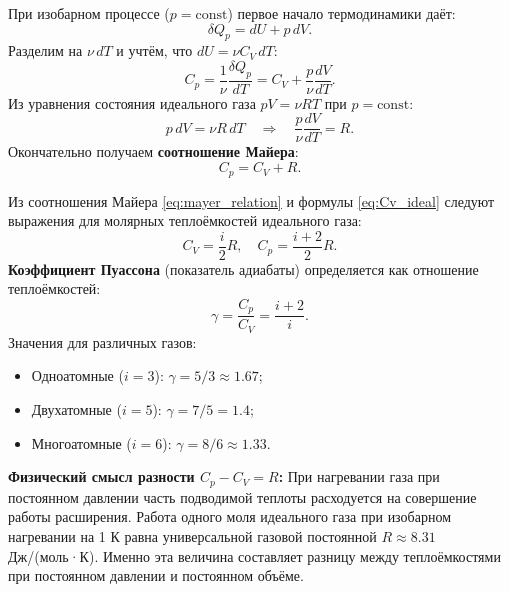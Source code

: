 \begin{theorem}
При изобарном процессе ($p = \text{const}$) первое начало термодинамики даёт:
\begin{equation}
    \delta Q_p = dU + p \, dV.
\end{equation}
Разделим на $\nu \, dT$ и учтём, что $dU = \nu C_V \, dT$:
\begin{equation}
    C_p = \frac{1}{\nu} \frac{\delta Q_p}{dT} = C_V + \frac{p}{\nu} \frac{dV}{dT}.
\end{equation}
Из уравнения состояния идеального газа $pV = \nu R T$ при $p = \text{const}$:
\begin{equation}
    p \, dV = \nu R \, dT \quad \Rightarrow \quad \frac{p}{\nu} \frac{dV}{dT} = R.
\end{equation}
Окончательно получаем \textbf{соотношение Майера}:
\begin{equation}
    C_p = C_V + R. \label{eq:mayer_relation}
\end{equation}
\end{theorem}

\begin{property}
Из соотношения Майера \eqref{eq:mayer_relation} и формулы \eqref{eq:Cv_ideal} следуют выражения для молярных теплоёмкостей идеального газа:
\begin{equation}
    C_V = \frac{i}{2} R, \quad C_p = \frac{i+2}{2} R.
\end{equation}
\textbf{Коэффициент Пуассона} (показатель адиабаты) определяется как отношение теплоёмкостей:
\begin{equation}
    \gamma = \frac{C_p}{C_V} = \frac{i+2}{i}.
\end{equation}
Значения для различных газов:
\begin{itemize}
    \item Одноатомные ($i=3$): $\gamma = 5/3 \approx 1.67$;
    \item Двухатомные ($i=5$): $\gamma = 7/5 = 1.4$;
    \item Многоатомные ($i=6$): $\gamma = 8/6 \approx 1.33$.
\end{itemize}
\end{property}

\begin{remark}
\textbf{Физический смысл разности $C_p - C_V = R$:} При нагревании газа при постоянном давлении часть подводимой теплоты расходуется на совершение работы расширения. Работа одного моля идеального газа при изобарном нагревании на 1 К равна универсальной газовой постоянной $R \approx 8.31$ Дж/(моль·К). Именно эта величина составляет разницу между теплоёмкостями при постоянном давлении и постоянном объёме.
\end{remark}
